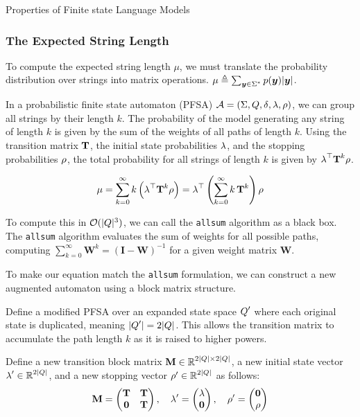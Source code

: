 \begin{question}{Properties of Finite state Language Models}

\begin{subquestion}

\subsubsection*{The Expected String Length}

To compute the expected string length $\mu$, we must translate the probability distribution over strings into matrix operations. $\mu \triangleq \sum_{\str \in \kleene{\alphabet}} \pLM(\str) |\str|$.

In a probabilistic finite state automaton (PFSA) $\automaton = \wfsatuple$, we can group all strings by their length $k$. The probability of the model generating any string of length $k$ is given by the sum of the weights of all paths of length $k$. Using the transition matrix $\transMtx$, the initial state probabilities $\initf$, and the stopping probabilities $\finalf$, the total probability for all strings of length $k$ is given by $\initf^\top \transMtx^k \finalf$.

\begin{equation}
    \mu = \sum_{k=0}^{\infty} k \left(\initf^\top \transMtx^k \finalf\right) = \initf^\top \left( \sum_{k=0}^{\infty} k\, \transMtx^k \right) \finalf
\end{equation}

To compute this in $\bigo(|\states|^3)$, we can call the \texttt{allsum} algorithm as a black box. The \texttt{allsum} algorithm evaluates the sum of weights for all possible paths, computing $\sum_{k=0}^{\infty} \mathbf{W}^k = (\mathbf{I} - \mathbf{W})^{-1}$ for a given weight matrix $\mathbf{W}$.

To make our equation match the \texttt{allsum} formulation, we can construct a new augmented automaton using a block matrix structure.

Define a modified PFSA over an expanded state space $\states'$ where each original state is duplicated, meaning $|\states'| = 2|\states|$. 
This allows the transition matrix to accumulate the path length $k$ as it is raised to higher powers.

Define a new transition block matrix $\mathbf{M} \in \R^{2|\states| \times 2|\states|}$, a new initial state vector $\initf' \in \R^{2|\states|}$, and a new stopping vector $\finalf' \in \R^{2|\states|}$ as follows:
\begin{equation}
    \mathbf{M} = \begin{pmatrix} \transMtx & \transMtx \\ \mathbf{0} & \transMtx \end{pmatrix}, \quad
    \initf' = \begin{pmatrix} \initf \\ \mathbf{0} \end{pmatrix}, \quad
    \finalf' = \begin{pmatrix} \mathbf{0} \\ \finalf \end{pmatrix}
\end{equation}


\end{subquestion}
\end{question}
